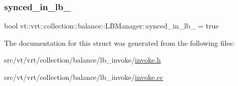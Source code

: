 \mbox{\label{structvt_1_1vrt_1_1collection_1_1balance_1_1_l_b_manager_aa47677efcfd106dbd8ab387b1a8e0c21}} 
\subsubsection{\texorpdfstring{synced\+\_\+in\+\_\+lb\+\_\+}{synced\_in\_lb\_}}
{\footnotesize\ttfamily bool vt\+::vrt\+::collection\+::balance\+::\+L\+B\+Manager\+::synced\+\_\+in\+\_\+lb\+\_\+ = true\hspace{0.3cm}{\ttfamily [private]}}



The documentation for this struct was generated from the following files\+:\begin{DoxyCompactItemize}
\item 
src/vt/vrt/collection/balance/lb\+\_\+invoke/\hyperlink{invoke_8h}{invoke.\+h}\item 
src/vt/vrt/collection/balance/lb\+\_\+invoke/\hyperlink{invoke_8cc}{invoke.\+cc}\end{DoxyCompactItemize}
